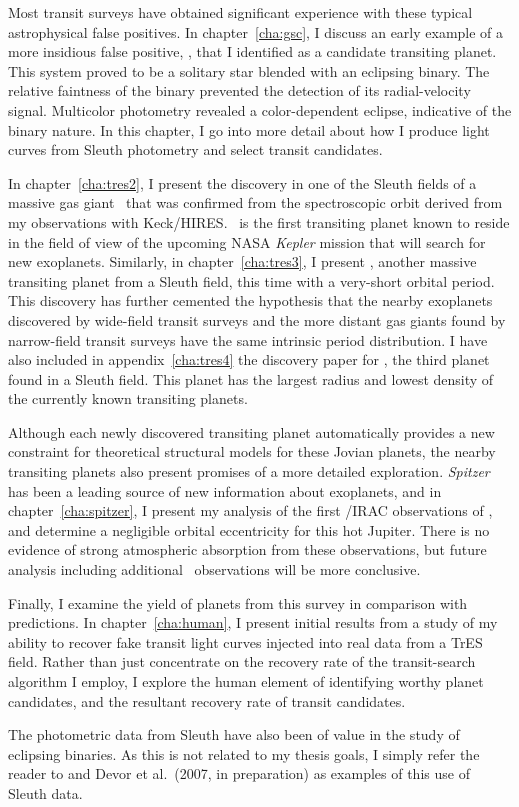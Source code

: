 Most transit surveys have obtained significant experience with these typical astrophysical false positives. 
In chapter~\ref{cha:gsc}, I discuss an early example of a more insidious false positive, \gscOTE, that I identified as a candidate transiting planet.
This system proved to be a solitary star blended with an eclipsing binary. 
The relative faintness of the binary prevented the detection of its radial-velocity signal. 
Multicolor photometry revealed a color-dependent eclipse, indicative of the binary nature.
In this chapter, I go into more detail about how I produce light curves from Sleuth photometry and select transit candidates. 

In chapter~\ref{cha:tres2}, I present the discovery in one of the Sleuth fields of a massive gas giant \tresTwo\ that was confirmed from the spectroscopic orbit derived from my observations with Keck/HIRES. 
\tresTwo\ is the first transiting planet known to reside in the field of view of the upcoming NASA {\it Kepler} mission that will search for new exoplanets.
Similarly, in chapter~\ref{cha:tres3}, I present \tresThree, another massive transiting planet from a Sleuth field, this time with a very-short orbital period. 
This discovery has further cemented the hypothesis that the nearby exoplanets discovered by wide-field transit surveys and the more distant gas giants found by narrow-field transit surveys have the same intrinsic period distribution. 
I have also included in appendix~\ref{cha:tres4} the discovery paper for \tresFour, the third planet found in a Sleuth field. 
This planet has the largest radius and lowest density of the currently known transiting planets.

Although each newly discovered transiting planet automatically provides a new constraint for theoretical structural models for these Jovian planets, the nearby transiting planets also present promises of a more detailed exploration. 
{\it Spitzer} has been a leading source of new information about exoplanets, and in chapter~\ref{cha:spitzer}, I present my analysis of the first \spi/IRAC observations of \tresTwo, and determine a negligible orbital eccentricity for this hot Jupiter. There is no evidence of strong atmospheric absorption from these observations, but future analysis including additional \spi\ observations will be more conclusive. 

Finally, I examine the yield of planets from this survey in comparison with predictions. 
In chapter~\ref{cha:human}, I present initial results from a study of my ability to recover fake transit light curves injected into real data from a TrES field. 
Rather than just concentrate on the recovery rate of the transit-search algorithm I employ, I explore the human element of identifying worthy planet candidates, and the resultant recovery rate of transit candidates.

The photometric data from Sleuth have also been of value in the study of eclipsing binaries. As this is not related to my thesis goals, I simply refer the reader to \citet{Creevey_Benedict_Brown:apjl:2005a} and Devor et al.~(2007, in preparation) as examples of this use of Sleuth data. 

